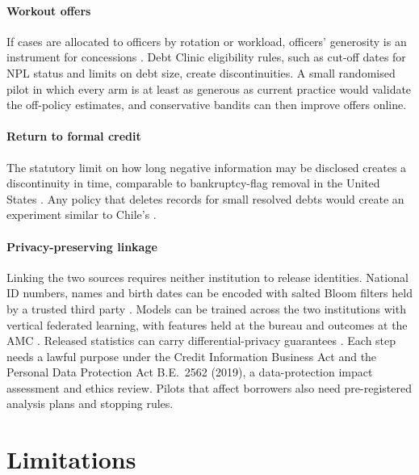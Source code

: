 \documentclass[10pt]{article}
\begin{document}
\paragraph{Workout offers} If cases are allocated to officers by rotation or workload, officers' generosity is an instrument for concessions \citep{dobbie2015}. Debt Clinic eligibility rules, such as cut-off dates for NPL status and limits on debt size, create discontinuities. A small randomised pilot in which every arm is at least as generous as current practice would validate the off-policy estimates, and conservative bandits \citep{kazerouni2017} can then improve offers online.

\paragraph{Return to formal credit} The statutory limit on how long negative information may be disclosed creates a discontinuity in time, comparable to bankruptcy-flag removal in the United States \citep{musto2004,dobbie2020bad}. Any policy that deletes records for small resolved debts would create an experiment similar to Chile's \citep{liberman2018}.

\paragraph{Privacy-preserving linkage} Linking the two sources requires neither institution to release identities. National ID numbers, names and birth dates can be encoded with salted Bloom filters held by a trusted third party \citep{schnell2009}. Models can be trained across the two institutions with vertical federated learning, with features held at the bureau and outcomes at the AMC \citep{cheng2021secureboost}. Released statistics can carry differential-privacy guarantees \citep{dwork2014}. Each step needs a lawful purpose under the Credit Information Business Act and the Personal Data Protection Act B.E.~2562 (2019), a data-protection impact assessment and ethics review. Pilots that affect borrowers also need pre-registered analysis plans and stopping rules.

\section{Limitations}\label{sec:limits}
\end{document}
